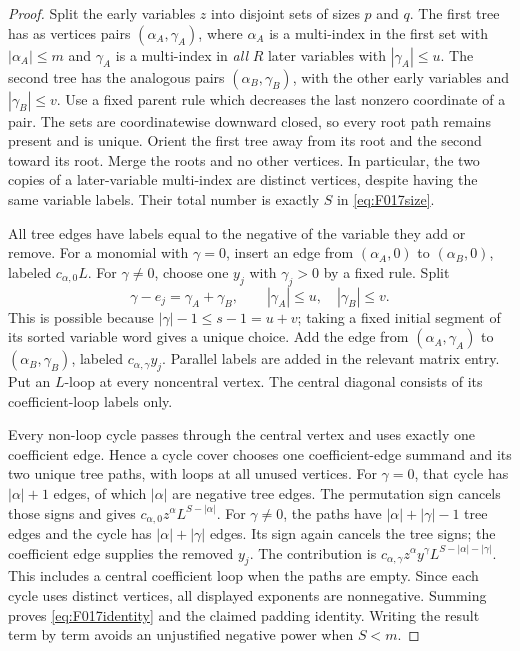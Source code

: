 \begin{proof}
Split the early variables \(z\) into disjoint sets of sizes
\(p\) and \(q\). The first tree has as vertices pairs
\((\alpha_A,\gamma_A)\), where \(\alpha_A\) is a
multi-index in the first set with \(|\alpha_A|\leq m\)
and \(\gamma_A\) is a multi-index in \emph{all} \(R\)
later variables with \(|\gamma_A|\leq u\).
The second tree has the analogous pairs
\((\alpha_B,\gamma_B)\), with the other early variables
and \(|\gamma_B|\leq v\).
Use a fixed parent rule which decreases the last nonzero
coordinate of a pair. The sets are coordinatewise downward
closed, so every root path remains present and is unique.
Orient the first tree away from its root and the second
toward its root. Merge the roots and no other vertices.
In particular, the two copies of a later-variable multi-index
are distinct vertices, despite having the same variable labels.
Their total number is exactly \(S\) in \eqref{eq:F017size}.

All tree edges have labels equal to the negative of the
variable they add or remove. For a monomial with \(\gamma=0\),
insert an edge from \((\alpha_A,0)\) to
\((\alpha_B,0)\), labeled \(c_{\alpha,0}L\).
For \(\gamma\ne0\), choose one \(y_j\) with
\(\gamma_j>0\) by a fixed rule. Split
\[
              \gamma-e_j=\gamma_A+\gamma_B,
                     \qquad |\gamma_A|\leq u,
                            \quad |\gamma_B|\leq v.
\]
This is possible because \(|\gamma|-1\leq s-1=u+v\);
taking a fixed initial segment of its sorted variable word
gives a unique choice. Add the edge from
\((\alpha_A,\gamma_A)\) to
\((\alpha_B,\gamma_B)\), labeled
\(c_{\alpha,\gamma}y_j\).
Parallel labels are added in the relevant matrix entry.
Put an \(L\)-loop at every noncentral vertex. The central
diagonal consists of its coefficient-loop labels only.

Every non-loop cycle passes through the central vertex and
uses exactly one coefficient edge. Hence a cycle cover chooses
one coefficient-edge summand and its two unique tree paths,
with loops at all unused vertices.
For \(\gamma=0\), that cycle has \(|\alpha|+1\) edges,
of which \(|\alpha|\) are negative tree edges. The
permutation sign cancels those signs and gives
\(c_{\alpha,0}z^\alpha L^{S-|\alpha|}\).
For \(\gamma\ne0\), the paths have
\(|\alpha|+|\gamma|-1\) tree edges and the cycle has
\(|\alpha|+|\gamma|\) edges. Its sign again cancels
the tree signs; the coefficient edge supplies the removed
\(y_j\). The contribution is
\(c_{\alpha,\gamma}z^\alpha y^\gamma
L^{S-|\alpha|-|\gamma|}\).
This includes a central coefficient loop when the paths
are empty. Since each cycle uses distinct vertices, all
displayed exponents are nonnegative. Summing proves
\eqref{eq:F017identity} and the claimed padding identity.
Writing the result term by term avoids an unjustified
negative power when \(S<m\).
\end{proof}

